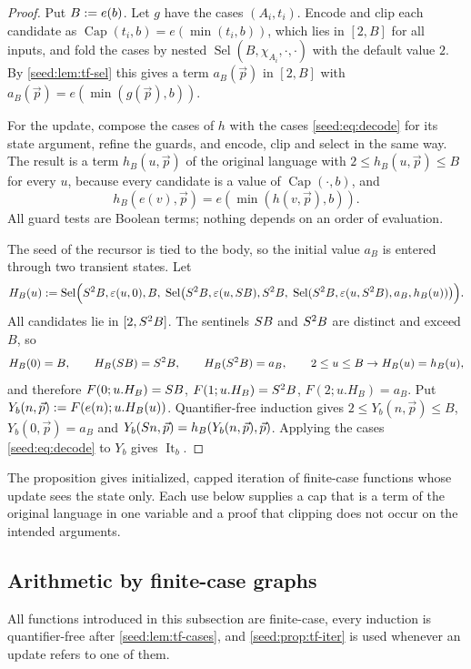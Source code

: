 \begin{proof}
Put $B\mathrel{:=} e(b)$. Let $g$ have the cases $(A_i,t_i)$. Encode and clip each
candidate as $\operatorname{Cap}(t_i,b)=e(\min(t_i,b))$, which lies in
$[2,B]$ for all inputs, and fold the cases by nested
$\operatorname{Sel}(B,\chi_{A_i},\cdot,\cdot)$ with the default value $2$.
By \cref{seed:lem:tf-sel} this gives a term $a_B(\vec p)$ in $[2,B]$ with
$a_B(\vec p)=e(\min(g(\vec p),b))$.

For the update, compose the cases of $h$ with the cases
\eqref{seed:eq:decode} for its state argument, refine the guards, and encode,
clip and select in the same way. The result is a term $h_B(u,\vec p)$ of
the original language with $2\leq h_B(u,\vec p)\leq B$ for every $u$,
because every candidate is a value of $\operatorname{Cap}(\cdot,b)$, and
\[
 h_B(e(v),\vec p)=e(\min(h(v,\vec p),b)).
\]
All guard tests are Boolean terms; nothing depends on an order of
evaluation.

The seed of the recursor is tied to the body, so the initial value $a_B$ is
entered through two transient states. Let
\[
 H_B(u)\mathrel{:=}\operatorname{Sel}\Bigl(S^2B,\varepsilon(u,0),B,\;
 \operatorname{Sel}\bigl(S^2B,\varepsilon(u,S B),S^2B,\;
 \operatorname{Sel}(S^2B,\varepsilon(u,S^2B),a_B,h_B(u))\bigr)\Bigr).
\]
All candidates lie in $[2,S^2B]$. The sentinels $S B$ and $S^2B$
are distinct and exceed $B$, so
\[
 H_B(0)=B,\qquad H_B(S B)=S^2B,\qquad H_B(S^2B)=a_B,\qquad
 2\leq u\leq B\to H_B(u)=h_B(u),
\]
and therefore $F(0;u.H_B)=S B$, $F(1;u.H_B)=S^2B$,
$F(2;u.H_B)=a_B$. Put $Y_b(n,\vec p)\mathrel{:=} F(e(n);u.H_B(u))$.
Quantifier-free induction gives $2\leq Y_b(n,\vec p)\leq B$,
$Y_b(0,\vec p)=a_B$ and
$Y_b(S n,\vec p)=h_B(Y_b(n,\vec p),\vec p)$. Applying the cases
\eqref{seed:eq:decode} to $Y_b$ gives $\operatorname{It}_b$.
\end{proof}

The proposition gives initialized, capped iteration of finite-case
functions whose update sees the state only. Each use below supplies a cap
that is a term of the original language in one variable and a proof that
clipping does not occur on the intended arguments.

\subsection{Arithmetic by finite-case graphs}

All functions introduced in this subsection are finite-case, every induction
is quantifier-free after \cref{seed:lem:tf-cases}, and
\cref{seed:prop:tf-iter} is used whenever an update refers to one of them.


